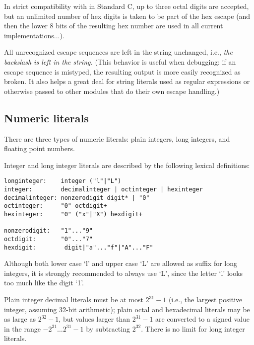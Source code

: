 In strict compatibility with in Standard C, up to three octal digits are
accepted, but an unlimited number of hex digits is taken to be part of
the hex escape (and then the lower 8 bits of the resulting hex number
are used in all current implementations...).

All unrecognized escape sequences are left in the string unchanged,
i.e., {\em the backslash is left in the string.}  (This behavior is
useful when debugging: if an escape sequence is mistyped, the
resulting output is more easily recognized as broken.  It also helps a
great deal for string literals used as regular expressions or
otherwise passed to other modules that do their own escape handling.)

\subsection{Numeric literals}

There are three types of numeric literals: plain integers, long
integers, and floating point numbers.

Integer and long integer literals are described by the following
lexical definitions:

\begin{verbatim}
longinteger:    integer ("l"|"L")
integer:        decimalinteger | octinteger | hexinteger
decimalinteger: nonzerodigit digit* | "0"
octinteger:     "0" octdigit+
hexinteger:     "0" ("x"|"X") hexdigit+

nonzerodigit:   "1"..."9"
octdigit:       "0"..."7"
hexdigit:        digit|"a"..."f"|"A"..."F"
\end{verbatim}

Although both lower case `l' and upper case `L' are allowed as suffix
for long integers, it is strongly recommended to always use `L', since
the letter `l' looks too much like the digit `1'.

Plain integer decimal literals must be at most $2^{31} - 1$ (i.e., the
largest positive integer, assuming 32-bit arithmetic); plain octal and
hexadecimal literals may be as large as $2^{32} - 1$, but values
larger than $2^{31} - 1$ are converted to a signed value in the range
$-2^{31} \dots 2^{31} - 1$ by subtracting $2^{32}$.  There is no limit
for long integer literals.

